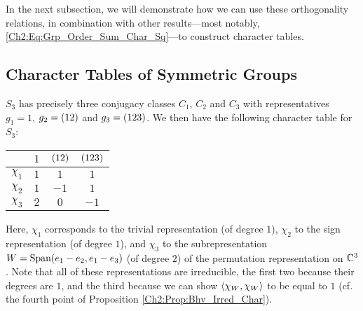 In the next subsection, we will demonstrate how we can use these orthogonality relations, in combination with other results---most notably, \eqref{Ch2:Eq:Grp_Order_Sum_Char_Sq}---to construct character tables.

\subsection{Character Tables of Symmetric Groups}

\begin{boxexample}[$S_3$]
    $S_3$ has precisely three conjugacy classes $C_1$, $C_2$ and $C_3$ with representatives $g_1 = 1$, $g_2 = \left( 1 2 \right)$ and $g_3 = \left( 1 2 3 \right)$. We then have the following character table for $S_3$:
    \begin{table}[H]
        \centering
        \begin{tabular}{c|ccc}
            & $1$ & $\left( 12 \right)$ & $\left( 123 \right)$ \\
            \hline
            $\chi_1$ & $1$ & $1$ & $1$ \\
            $\chi_2$ & $1$ & $-1$ & $1$ \\
            $\chi_3$ & $2$ & $0$ & $-1$
        \end{tabular}
    \end{table}
    Here, $\chi_1$ corresponds to the trivial representation (of degree $1$), $\chi_2$ to the sign representation (of degree $1$), and $\chi_3$ to the subrepresentation $W = \operatorname{Span}\!\left( e_1 - e_2, e_1 - e_3 \right)$ (of degree $2$) of the permutation representation on $\mathbb{C}^3$. Note that all of these representations are irreducible, the first two because their degrees are $1$, and the third because we can show $\left\langle \chi_W, \chi_W \right\rangle$ to be equal to $1$ (cf. the fourth point of Proposition \ref{Ch2:Prop:Bhv_Irred_Char}).
\end{boxexample}


